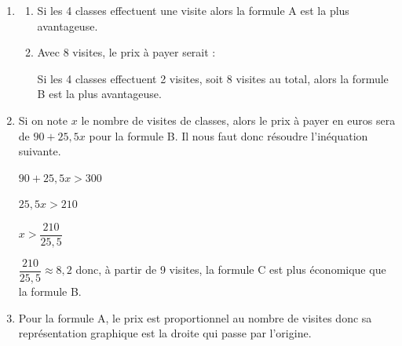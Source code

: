\begin{enumerate}
	\item 
	\begin{enumerate}
	\item
	
	\medskip
	Si les 4 classes effectuent une visite alors la formule A est la plus avantageuse.
	
	\item Avec 8 visites, le prix à payer serait : 
	
	\medskip
	Si les 4 classes effectuent 2 visites, soit 8 visites au total, alors la formule B est la plus avantageuse.
	\end{enumerate}
	
	\item Si on note $x$ le nombre de visites de classes, alors le prix à payer en euros sera de $90+25,5x$ pour la formule B. Il nous faut donc résoudre l'inéquation suivante.
	
	\medskip
	 $90+25,5x > 300$
	 
	 \medskip
	 $25,5x > 210$
	 
	 \medskip
	 $x > \dfrac{210}{25,5}$
	
	\medskip
	$\dfrac{210}{25,5}\approx8,2$ donc, à partir de 9 visites, la formule C est plus économique que la formule B.
	
	\item Pour la formule A, le prix est proportionnel au nombre de visites donc sa représentation graphique est la droite qui passe par l'origine.
	

\end{enumerate}
